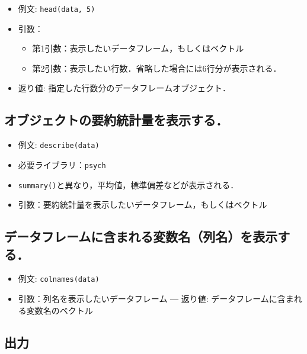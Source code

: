 \documentclass[
  xelatex, ja=standard]{bxjsarticle}
\providecommand{\tightlist}{%
  \setlength{\itemsep}{0pt}\setlength{\parskip}{0pt}}
\begin{document}
\begin{itemize}
\tightlist
\item
  例文: \texttt{head(data,\ 5)}
\item
  引数：

  \begin{itemize}
  \tightlist
  \item
    第1引数：表示したいデータフレーム，もしくはベクトル
  \item
    第2引数：表示したい行数．省略した場合には6行分が表示される．
  \end{itemize}
\item
  返り値: 指定した行数分のデータフレームオブジェクト．
\end{itemize}

\subsection{オブジェクトの要約統計量を表示する．}\label{ux30aaux30d6ux30b8ux30a7ux30afux30c8ux306eux8981ux7d04ux7d71ux8a08ux91cfux3092ux8868ux793aux3059ux308b}

\begin{itemize}
\tightlist
\item
  例文: \texttt{describe(data)}
\item
  必要ライブラリ：\texttt{psych}
\item
  \texttt{summary()}と異なり，平均値，標準偏差などが表示される．
\item
  引数：要約統計量を表示したいデータフレーム，もしくはベクトル
\end{itemize}

\subsection{データフレームに含まれる変数名（列名）を表示する．}\label{ux30c7ux30fcux30bfux30d5ux30ecux30fcux30e0ux306bux542bux307eux308cux308bux5909ux6570ux540dux5217ux540dux3092ux8868ux793aux3059ux308b}

\begin{itemize}
\tightlist
\item
  例文: \texttt{colnames(data)}
\item
  引数：列名を表示したいデータフレーム ― 返り値:
  データフレームに含まれる変数名のベクトル
\end{itemize}

\subsection{出力}\label{ux51faux529b}
\end{document}
